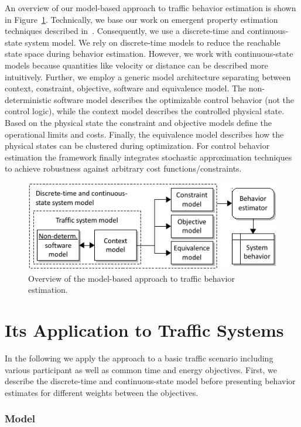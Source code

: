 \documentclass[conference]{../cls/IEEEtran}
\begin{document}
An overview of our model-based approach to traffic behavior estimation is shown in Figure~\ref{fig:framework}. Technically, we base our work on emergent property estimation techniques described in~\cite{Hackenberg2012}. Consequently, we use a discrete-time and continuous-state system model. We rely on discrete-time models to reduce the reachable state space during behavior estimation. However, we work with continuous-state models because quantities like velocity or distance can be described more intuitively. Further, we employ a generic model architecture separating between context, constraint, objective, software and equivalence model. The non-deterministic software model describes the optimizable control behavior (not the control logic), while the context model describes the controlled physical state. Based on the physical state the constraint and objective models define the operational limits and costs. Finally, the equivalence model describes how the physical states can be clustered during optimization. For control behavior estimation the framework finally integrates stochastic approximation techniques~\cite{Pereira1991} to achieve robustness against arbitrary cost functions/constraints.
\begin{figure}[h]
	\centering
	\includegraphics{../gfx/framework.pdf}
	\caption{Overview of the model-based approach to traffic behavior estimation.}
	\label{fig:framework}
\end{figure}

\section{Its Application to Traffic Systems}

In the following we apply the approach to a basic traffic scenario including various participant as well as common time and energy objectives.
First, we describe the discrete-time and continuous-state model before presenting behavior estimates for different weights between the objectives.

\subsubsection{Model}
\end{document}
